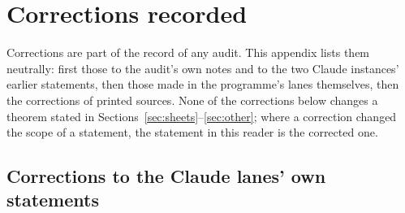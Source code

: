 \section{Corrections recorded}\label{app:corrections}

Corrections are part of the record of any audit. This appendix lists them neutrally: first those to the audit's own notes and to the two Claude instances' earlier statements, then those made in the programme's lanes themselves, then the corrections of printed sources. None of the corrections below changes a theorem stated in Sections~\ref{sec:sheets}--\ref{sec:other}; where a correction changed the scope of a statement, the statement in this reader is the corrected one.

\subsection{Corrections to the Claude lanes' own statements}

